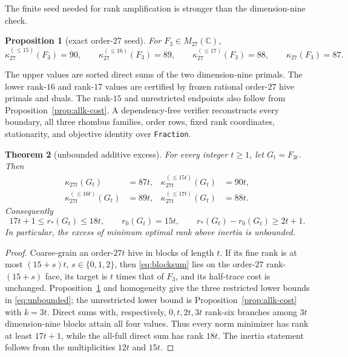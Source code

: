 \documentclass[11pt]{article}
\newtheorem{theorem}{Theorem}[section]
\newtheorem{proposition}[theorem]{Proposition}
\begin{document}
The finite seed needed for rank amplification is stronger than the
dimension-nine check.

\begin{proposition}[exact order-$27$ seed]\label{prop:seed27}
For $F_3\in M_{27}(\mathbb C)$,
\[
 \kappa_{27}^{(\le15)}(F_3)=90,\qquad
 \kappa_{27}^{(\le16)}(F_3)=89,\qquad
 \kappa_{27}^{(\le17)}(F_3)=88,\qquad
 \kappa_{27}(F_3)=87.
\]
\end{proposition}

The upper values are sorted direct sums of the two dimension-nine primals.
The lower rank-$16$ and rank-$17$ values are certified by frozen rational
order-$27$ hive primals and duals.  The rank-$15$ and unrestricted endpoints
also follow from Proposition~\ref{prop:allk-cost}.  A dependency-free verifier
reconstructs every boundary, all three rhombus families, order rows, fixed
rank coordinates, stationarity, and objective identity over
\texttt{Fraction}.

\begin{theorem}[unbounded additive excess]\label{thm:unbounded}
For every integer $t\ge1$, let $G_t=F_{3t}$.  Then
\begin{align}
 \kappa_{27t}(G_t)&=87t, &
 \kappa_{27t}^{(\le15t)}(G_t)&=90t,\nonumber\\
 \kappa_{27t}^{(\le16t)}(G_t)&=89t, &
 \kappa_{27t}^{(\le17t)}(G_t)&=88t.
 \label{eq:unbounded}
\end{align}
Consequently
\[
 17t+1\le r_*(G_t)\le18t,
 \qquad r_0(G_t)=15t,
 \qquad r_*(G_t)-r_0(G_t)\ge2t+1.
\]
In particular, the excess of minimum optimal rank above inertia is unbounded.
\end{theorem}

\begin{proof}
Coarse-grain an order-$27t$ hive in blocks of length $t$.  If its fine rank
is at most $(15+s)t$, $s\in\{0,1,2\}$, then \eqref{eq:blocksum} lies on the
order-$27$ rank-$(15+s)$ face, its target is $t$ times that of $F_3$, and its
half-trace cost is unchanged.  Proposition~\ref{prop:seed27} and homogeneity
give the three restricted lower bounds in \eqref{eq:unbounded}; the
unrestricted lower bound is Proposition~\ref{prop:allk-cost} with $k=3t$.
Direct sums with,
respectively, $0,t,2t,3t$ rank-six branches among $3t$ dimension-nine blocks
attain all four values.  Thus every norm minimizer has rank at least $17t+1$,
while the all-full direct sum has rank $18t$.  The inertia statement follows
from the multiplicities $12t$ and $15t$.
\end{proof}
\end{document}
